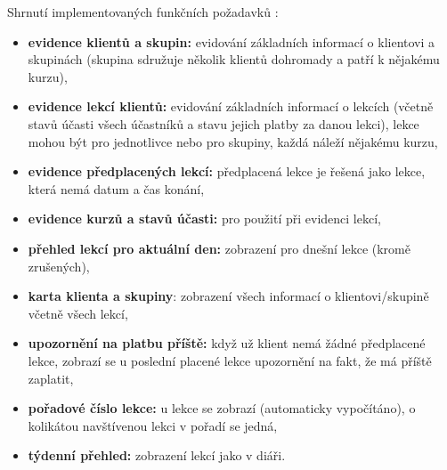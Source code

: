 Shrnutí implementovaných funkčních požadavků \cite{bp}:
\begin{itemize}
    \item \textbf{evidence klientů a skupin:} evidování základních informací o klientovi a skupinách (skupina sdružuje několik klientů dohromady a patří k nějakému kurzu),
    \item \textbf{evidence lekcí klientů:} evidování základních informací o lekcích (včetně stavů účasti všech účastníků a stavu jejich platby za danou lekci), lekce mohou být pro jednotlivce nebo pro skupiny, každá náleží nějakému kurzu,
    \item \textbf{evidence předplacených lekcí:} předplacená lekce je řešená jako lekce, která nemá datum a čas konání,
    \item \textbf{evidence kurzů a stavů účasti:} pro použití při evidenci lekcí,
    \item \textbf{přehled lekcí pro aktuální den:} zobrazení pro dnešní lekce (kromě zrušených),
    \item \textbf{karta klienta a skupiny}: zobrazení všech informací o klientovi/skupině včetně všech lekcí,
    \item \textbf{upozornění na platbu příště:} když už klient nemá žádné předplacené lekce, zobrazí se u poslední placené lekce upozornění na fakt, že má příště zaplatit,
    \item \textbf{pořadové číslo lekce:} u lekce se zobrazí (automaticky vypočítáno), o kolikátou navštívenou lekci v pořadí se jedná,
    \item \textbf{týdenní přehled:} zobrazení lekcí jako v diáři.
\end{itemize}

